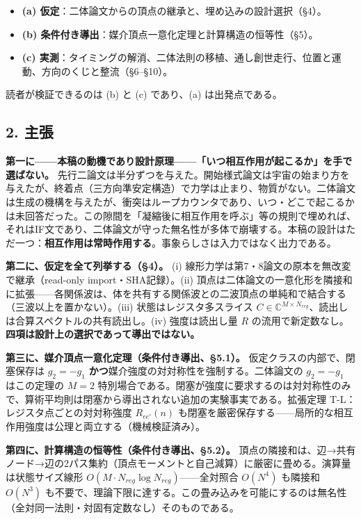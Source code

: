 \documentclass[
  a4paper,
]{ltjsarticle}
\providecommand{\tightlist}{%
  \setlength{\itemsep}{0pt}\setlength{\parskip}{0pt}}
\begin{document}
\begin{itemize}
\tightlist
\item
  \textbf{(a)
  仮定}：二体論文からの頂点の継承と、埋め込みの設計選択（§4）。
\item
  \textbf{(b)
  条件付き導出}：媒介頂点一意化定理と計算構造の恒等性（§5）。
\item
  \textbf{(c)
  実測}：タイミングの解消、二体法則の移植、通し創世走行、位置と運動、方向のくじと整流（§6--§10）。
\end{itemize}

読者が検証できるのは (b) と (c) であり、(a) は出発点である。

\subsection{2. 主張}\label{ux4e3bux5f35}

\textbf{第一に------本稿の動機であり設計原理------「いつ相互作用が起こるか」を手で選ばない。}
先行二論文は半分ずつを与えた。開始様式論文は宇宙の始まり方を与えたが、終着点（三方向準安定構造）で力学は止まり、物質がない。二体論文は生成の機構を与えたが、衝突はループカウンタであり、いつ・どこで起こるかは未回答だった。この隙間を「凝縮後に相互作用を呼ぶ」等の規則で埋めれば、それはIF文であり、二体論文が守った無名性が多体で崩壊する。本稿の設計はただ一つ：\textbf{相互作用は常時作用する}。事象らしさは入力ではなく出力である。

\textbf{第二に、仮定を全て列挙する（§4）。} (i)
線形力学は第7・8論文の原本を無改変で継承（read-only
import・SHA記録）。(ii)
頂点は二体論文の一意化形を隣接和に拡張------各関係波は、体を共有する関係波との二波頂点の単純和で結合する（三波以上を置かない）。(iii)
状態はレジスタ多スライス
\(C\in\mathbb{C}^{M\times N_{reg}}\)、読出しは合算スペクトルの共有読出し。(iv)
強度は読出し量 \(R\)
の流用で新定数なし。\textbf{四項は設計上の選択であって導出ではない。}

\textbf{第三に、媒介頂点一意化定理（条件付き導出、§5.1）。}
仮定クラスの内部で、閉塞保存は \(g_2=-g_1\)
\textbf{かつ}媒介強度の対対称性を強制する。二体論文の \(g_2=-g_1\)
はこの定理の \(M=2\)
特別場合である。閉塞が強度に要求するのは対対称性のみで、算術平均則は閉塞から導出されない追加の実験事実である。拡張定理
T-L：レジスタ点ごとの対対称強度 \(R_{ee'}(n)\)
も閉塞を厳密保存する------局所的な相互作用強度は公理と両立する（機械検証済み）。

\textbf{第四に、計算構造の恒等性（条件付き導出、§5.2）。}
頂点の隣接和は、辺→共有ノード→辺の2パス集約（頂点モーメントと自己減算）に厳密に畳める。演算量は状態サイズ線形
\(O(M\cdot N_{reg}\log N_{reg})\)------全対照合 \(O(N^4)\) も隣接和
\(O(N^3)\)
も不要で、理論下限に達する。この畳み込みを可能にするのは無名性（全対同一法則・対固有定数なし）そのものである。
\end{document}
